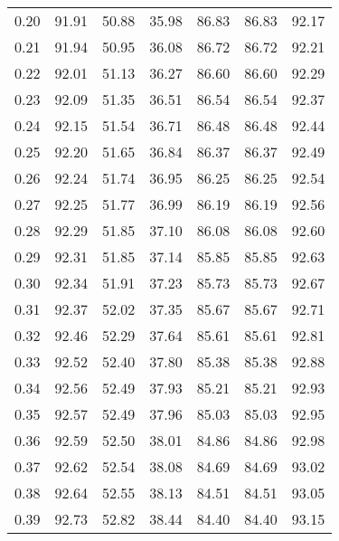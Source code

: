 \begin{tabular}{|c|c|c|c|c|c|c|}
      0.20 &     91.91 &     50.88 &      35.98 &   86.83 &      86.83 &         92.17 \\
      0.21 &     91.94 &     50.95 &      36.08 &   86.72 &      86.72 &         92.21 \\
      0.22 &     92.01 &     51.13 &      36.27 &   86.60 &      86.60 &         92.29 \\
      0.23 &     92.09 &     51.35 &      36.51 &   86.54 &      86.54 &         92.37 \\
      0.24 &     92.15 &     51.54 &      36.71 &   86.48 &      86.48 &         92.44 \\
      0.25 &     92.20 &     51.65 &      36.84 &   86.37 &      86.37 &         92.49 \\
      0.26 &     92.24 &     51.74 &      36.95 &   86.25 &      86.25 &         92.54 \\
      0.27 &     92.25 &     51.77 &      36.99 &   86.19 &      86.19 &         92.56 \\
      0.28 &     92.29 &     51.85 &      37.10 &   86.08 &      86.08 &         92.60 \\
      0.29 &     92.31 &     51.85 &      37.14 &   85.85 &      85.85 &         92.63 \\
      0.30 &     92.34 &     51.91 &      37.23 &   85.73 &      85.73 &         92.67 \\
      0.31 &     92.37 &     52.02 &      37.35 &   85.67 &      85.67 &         92.71 \\
      0.32 &     92.46 &     52.29 &      37.64 &   85.61 &      85.61 &         92.81 \\
      0.33 &     92.52 &     52.40 &      37.80 &   85.38 &      85.38 &         92.88 \\
      0.34 &     92.56 &     52.49 &      37.93 &   85.21 &      85.21 &         92.93 \\
      0.35 &     92.57 &     52.49 &      37.96 &   85.03 &      85.03 &         92.95 \\
      0.36 &     92.59 &     52.50 &      38.01 &   84.86 &      84.86 &         92.98 \\
      0.37 &     92.62 &     52.54 &      38.08 &   84.69 &      84.69 &         93.02 \\
      0.38 &     92.64 &     52.55 &      38.13 &   84.51 &      84.51 &         93.05 \\
      0.39 &     92.73 &     52.82 &      38.44 &   84.40 &      84.40 &         93.15 \\

\end{tabular}
